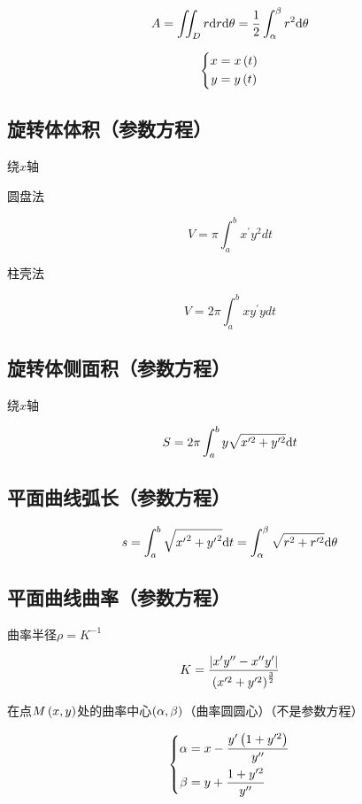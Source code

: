 \documentclass{article}
\begin{document}
\[A=\iint_Dr\mathrm d r\mathrm d\theta=\frac12\int_{\alpha}^{\beta}{r^2\mathrm d\theta}\]

\begin{definition}
    \[\left\{\begin{aligned}
            x & =x\left(t\right) \\
            y & =y\left(t\right)
        \end{aligned}\right.\]
\end{definition}

\subsection{旋转体体积（参数方程）}

绕$x$轴

圆盘法

\[V=\pi\int_a^bx^\prime y^2dt\]

柱壳法

\[V=2\pi\int_a^bxy^\prime ydt\]

\subsection{旋转体侧面积（参数方程）}

绕$x$轴

\[S=2\pi\int_a^b{y\sqrt{x^{\prime2}+y^{\prime2}}\mathrm d t}\]

\subsection{平面曲线弧长（参数方程）}

\[s=\int_a^b{\sqrt{{x^\prime}^2+{y^\prime}^2}\mathrm d t}=\int_{\alpha}^{\beta}{\sqrt{r^2+r^{\prime2}}\mathrm d\theta}\]

\subsection{平面曲线曲率（参数方程）}

曲率半径$\rho=K^{-1}$

\[K=\frac{\left|x^\prime y^{\prime\prime}-x^{\prime\prime}y^\prime\right|}{\left(x^{\prime2}+y^{\prime2}\right)^\frac32}\]

在点$M\left(x,y\right)$处的曲率中心$\left(\alpha,\beta\right)$（曲率圆圆心）（不是参数方程）

\[\left\{\begin{aligned}
        \alpha & =x-\frac{y^\prime\left(1+y^{\prime2}\right)}{y^{\prime\prime}} \\
        \beta  & =y+\frac{1+y^{\prime2}}{y^{\prime\prime}}
    \end{aligned}\right.\]
\end{document}
